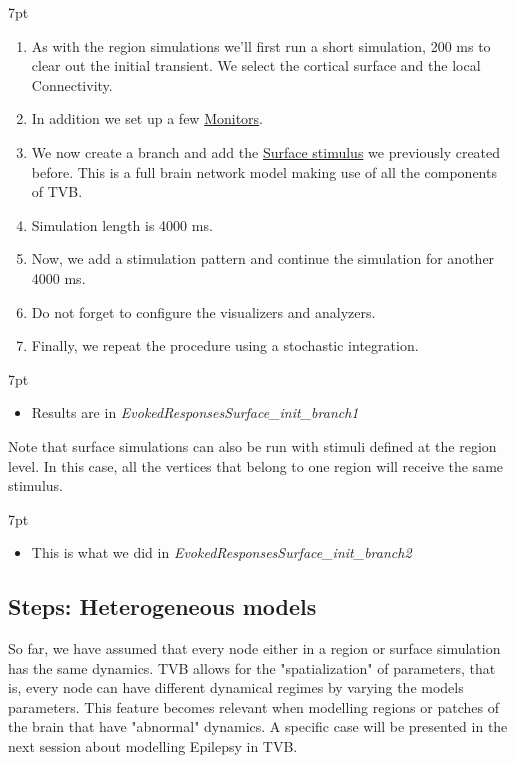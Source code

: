 \documentclass{tufte-handout}
\newenvironment{simulation}{%
  \def\FrameCommand{%
    \hspace{1pt}%
    {\color{ForestGreen}\vrule width 2pt}%
    {\color{simulationshade}\vrule width 4pt}%
    \colorbox{simulationshade}%
  }%
  \MakeFramed{\advance\hsize-\width\FrameRestore}%
  \noindent\hspace{-4.55pt}%
  \begin{adjustwidth}{}{7pt}%
  \vspace{2pt}\vspace{2pt}%
}
{%
  \vspace{2pt}\end{adjustwidth}\endMakeFramed%
}
\begin{document}
\begin{simulation}
\begin{enumerate}
\item As with the region simulations we'll first run a short simulation, 200 ms to clear out the initial transient. We select the cortical surface and the local Connectivity.
\item In addition we set up a few \underline{Monitors}.
\item We now create a branch and add the \underline{Surface stimulus} we previously created before. This is a full brain network model making use of all the components of TVB.
\item Simulation length is 4000 ms.
\item Now, we add a stimulation pattern and continue the simulation for another 4000 ms.
\item Do not forget to configure the visualizers and analyzers. 
\item Finally, we repeat the procedure using a stochastic integration.
\end{enumerate}
\end{simulation}


\begin{simulation}
\begin{itemize}
\item Results are in \textit{EvokedResponsesSurface\_init\_branch1}
\end{itemize}
\end{simulation}


Note that surface simulations can also be run with stimuli defined at the
region level. In this case, all the vertices that belong to one region will
receive the same stimulus.

\begin{simulation}
\begin{itemize}
\item This is what we did in \textit{EvokedResponsesSurface\_init\_branch2}
\end{itemize}
\end{simulation}


\subsection{Steps: Heterogeneous models}\label{sec:steps}


So far, we have assumed that every node either in a region or surface
simulation has the same dynamics. TVB allows for the "spatialization" of
parameters, that is, every node can have different dynamical regimes by
varying the models parameters. This feature becomes relevant when modelling
regions or patches of the brain that have "abnormal" dynamics. A specific case
will be presented in the next session about modelling Epilepsy in TVB.
\end{document}
